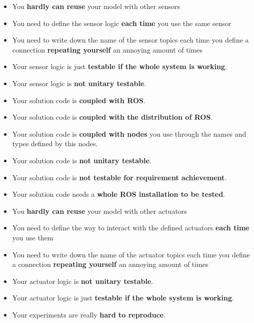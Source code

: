 \documentclass[a4paper,10pt,twoside]{book}
\begin{document}
					
					\begin{itemize}
						\item You \textbf{hardly can reuse} your model with other sensors
						\item You need to define the sensor logic \textbf{each time} you use the same sensor
						\item You need to write down the name of the sensor topics each time you define a connection \textbf{repeating yourself} an annoying amount of times
						\item Your sensor logic is just \textbf{testable if the whole system is working}.
						\item Your sensor logic is \textbf{not unitary testable}.
						
						\item Your solution code is \textbf{coupled with ROS}.
						\item Your solution code is \textbf{coupled with the distribution of ROS}.
						\item Your solution code is \textbf{coupled with nodes} you use through the names and types defined by this nodes. 
						\item Your solution code is \textbf{not unitary testable}.
						\item Your solution code is \textbf{not testable for requirement achievement}.
						\item Your solution code needs a \textbf{whole ROS installation to be tested}. 
						
						\item You \textbf{hardly can reuse} your model with other actuators
						\item You need to define the way to interact with the defined actuators \textbf{each time} you use them 
						\item You need to write down the name of the actuator topics each time you define a connection \textbf{repeating yourself} an annoying amount of times
						\item Your actuator logic is \textbf{not unitary testable}.
						\item Your actuator logic is just \textbf{testable if the whole system is working}.
						\item Your experiments are really \textbf{hard to reproduce}.
			
					\end{itemize} 
					
					
					
					
					
\end{document}

